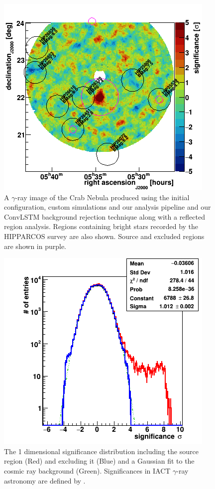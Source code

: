 \begin{figure}[] 
        \centering \includegraphics[width=\columnwidth]{figures/skysig.png}

        \caption{
                \label{fig:skysig} A $\gamma$-ray image of the Crab Nebula produced using the initial configuration, custom simulations and our analysis pipeline and our ConvLSTM background rejection technique along with a reflected region analysis. Regions containing bright stars recorded by the HIPPARCOS survey are also shown. Source and excluded regions are shown in purple.
        }
\end{figure}
\begin{figure}[] 
        \centering \includegraphics[width=0.5\columnwidth]{figures/sig1d.png}

        \caption{
                \label{fig:sig1D} The 1 dimensional significance distribution including the source region (Red) and excluding it (Blue) and a Gaussian fit to the cosmic ray background (Green). Significances in IACT $\gamma$-ray astronomy are defined by \cite{LiMa}.
        }
\end{figure}
